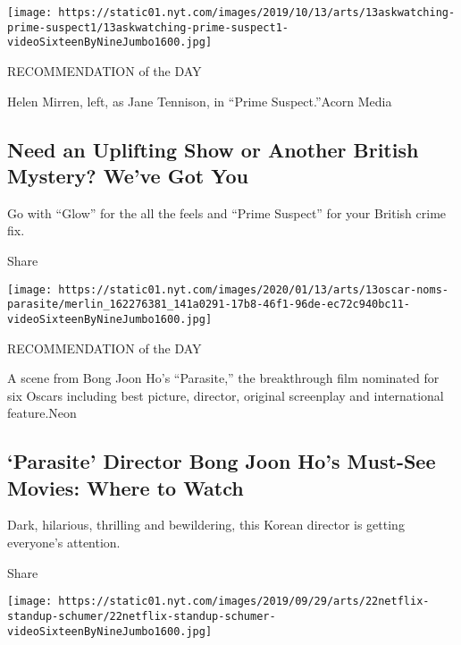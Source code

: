 \href{https://www.nytimes.com/2019/10/09/arts/television/watching-british-mysteries.html}{}

\texttt{[image: https://static01.nyt.com/images/2019/10/13/arts/13askwatching-prime-suspect1/13askwatching-prime-suspect1-videoSixteenByNineJumbo1600.jpg]}

RECOMMENDATION of the DAY

Helen Mirren, left, as Jane Tennison, in ``Prime Suspect.''Acorn Media

\hypertarget{need-an-uplifting-show-or-another-british-mystery-weve-got-you}{%
\subsection{Need an Uplifting Show or Another British Mystery? We've Got
You}\label{need-an-uplifting-show-or-another-british-mystery-weve-got-you}}

Go with ``Glow'' for the all the feels and ``Prime Suspect'' for your
British crime fix.

Share

\href{https://www.nytimes.com/article/bong-joon-ho-movies.html}{}

\texttt{[image: https://static01.nyt.com/images/2020/01/13/arts/13oscar-noms-parasite/merlin\_162276381\_141a0291-17b8-46f1-96de-ec72c940bc11-videoSixteenByNineJumbo1600.jpg]}

RECOMMENDATION of the DAY

A scene from Bong Joon Ho's ``Parasite,'' the breakthrough film
nominated for six Oscars including best picture, director, original
screenplay and international feature.Neon

\hypertarget{parasite-director-bong-joon-hos-must-see-movies-where-to-watch}{%
\subsection{`Parasite' Director Bong Joon Ho's Must-See Movies: Where to
Watch}\label{parasite-director-bong-joon-hos-must-see-movies-where-to-watch}}

Dark, hilarious, thrilling and bewildering, this Korean director is
getting everyone's attention.

Share

\href{https://www.nytimes.com/2019/05/21/arts/television/netflix-comedy-specials.html}{}

\texttt{[image: https://static01.nyt.com/images/2019/09/29/arts/22netflix-standup-schumer/22netflix-standup-schumer-videoSixteenByNineJumbo1600.jpg]}

